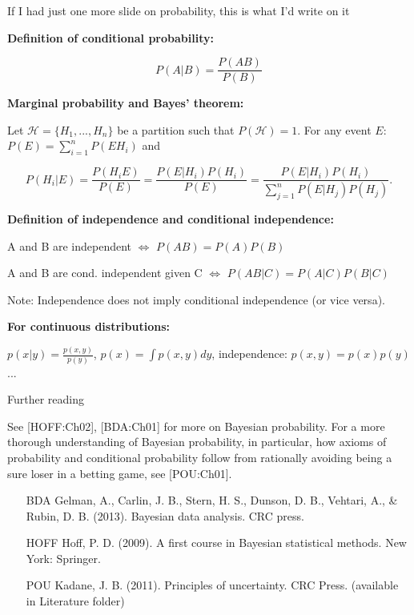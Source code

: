 \begin{frame}{\begin{large}If I had just one more slide on probability, this is what I'd write on it\end{large}}

\begin{scriptsize}

\textbf{Definition of conditional probability:}

$$ P(A|B) = \frac{P(AB)}{P(B)} $$

\textbf{Marginal probability and Bayes' theorem:}

Let $\mathcal{H} = \{H_1,..., H_n\}$ be a partition such that $P(\mathcal{H}) = 1$. For any event $E$: $P(E) = \sum_{i=1}^n P(E H_i)$ and

$$P(H_i | E) = \frac{P(H_iE)}{P(E)} = \frac{P(E | H_i)P(H_i)}{P(E)}=\frac{P(E | H_i)P(H_i)}{\sum_{j=1}^n P(E | H_j)P(H_j)}.$$

\textbf{Definition of independence and conditional independence:}

A and B are independent $\Leftrightarrow$ $P(AB) = P(A)P(B)$

A and B are cond. independent given C $\Leftrightarrow$ $P(AB|C) = P(A|C)P(B|C)$

Note: Independence does not imply conditional independence (or vice versa).

\smallskip

\textbf{For continuous distributions:}

$p(x|y) = \frac{p(x, y)}{p(y)}$, $p(x) = \int p(x, y) dy$, independence: $p(x,y) = p(x)p(y)$...


\end{scriptsize}

\end{frame}

\begin{frame}{Further reading}

See [HOFF:Ch02], [BDA:Ch01] for more on Bayesian probability. For a more thorough understanding of Bayesian probability, in particular, how axioms of probability and conditional probability follow from rationally avoiding being a sure loser in a betting game, see [POU:Ch01].

\bigskip

\begin{scriptsize}
\begin{itemize}
\item[BDA] Gelman, A., Carlin, J. B., Stern, H. S., Dunson, D. B., Vehtari, A., \& Rubin, D. B. (2013). Bayesian data analysis. CRC press.
\item[HOFF] Hoff, P. D. (2009). A first course in Bayesian statistical methods. New York: Springer.
\item [POU] Kadane, J. B. (2011). Principles of uncertainty. CRC Press. (available in Literature folder)
\end{itemize}
\end{scriptsize}
\end{frame}


